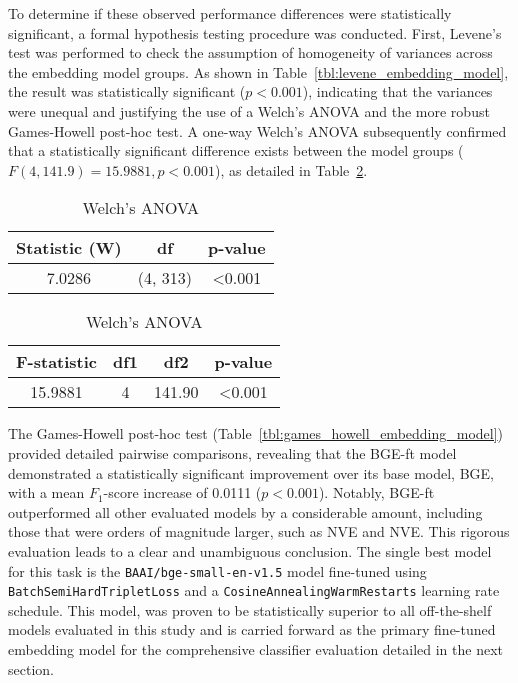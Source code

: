 To determine if these observed performance differences were statistically significant, a formal hypothesis testing procedure was conducted. First, Levene's test was performed to check the assumption of homogeneity of variances across the embedding model groups. As shown in Table~\ref{tbl:levene_embedding_model}, the result was statistically significant (\(p < 0.001\)), indicating that the variances were unequal and justifying the use of a Welch's ANOVA and the more robust Games-Howell post-hoc test. A one-way Welch's ANOVA subsequently confirmed that a statistically significant difference exists between the model groups (\(F(4, 141.9) = 15.9881, p < 0.001\)), as detailed in Table~\ref{tbl:anova_embedding_model}.

\begin{table}[tb]
    \captionsetup{skip=5pt}
\centering
\caption{Statistical Tests for F1-Scores by Embedding Model (Test Data)}
\label{tbl:stats_embedding_model}
\begin{subtable}{\linewidth}
\centering
\caption{Levene's Test for Homogeneity of Variances}
\label{tbl:levene_embedding_model}
\begin{tabular}{ccc}
\toprule
\textbf{Statistic (W)} & \textbf{df} & \textbf{p-value} \\
\midrule
7.0286 & (4, 313) & <0.001 \\
\bottomrule
\end{tabular}
\end{subtable}%
\vspace{1em}
\begin{subtable}{\linewidth}
\centering
\caption{Welch's ANOVA}
\label{tbl:anova_embedding_model}
\begin{tabular}{cccc}
\toprule
\textbf{F-statistic} & \textbf{df1} & \textbf{df2} & \textbf{p-value} \\
\midrule
15.9881 & 4 & 141.90 & <0.001 \\
\bottomrule
\end{tabular}
\end{subtable}
\end{table}

The Games-Howell post-hoc test (Table~\ref{tbl:games_howell_embedding_model}) provided detailed pairwise comparisons, revealing that the BGE-ft model demonstrated a statistically significant improvement over its base model, BGE, with a mean \(F_1\)-score increase of 0.0111 (\(p<0.001\)). Notably, BGE-ft outperformed all other evaluated models by a considerable amount, including those that were orders of magnitude larger, such as NVE and NVE. This rigorous evaluation leads to a clear and unambiguous conclusion. The single best model for this task is the \verb|BAAI/bge-small-en-v1.5| model fine-tuned using \verb|BatchSemiHardTripletLoss| and a \verb|CosineAnnealingWarmRestarts| learning rate schedule. This model, was proven to be statistically superior to all off-the-shelf models evaluated in this study and is carried forward as the primary fine-tuned embedding model for the comprehensive classifier evaluation detailed in the next section.{\setlength{\emergencystretch}{5em}\par}

